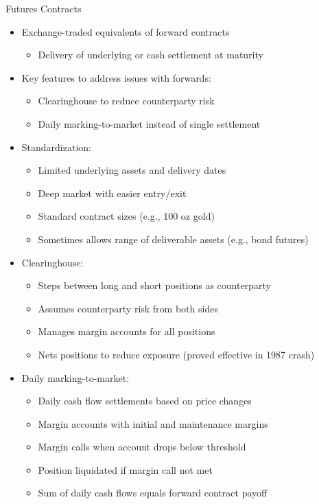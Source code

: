 \documentclass[10pt]{beamer}
\begin{document}
\begin{frame}{Futures Contracts}
  \begin{itemize}[<+->]
    \item Exchange-traded equivalents of forward contracts
      \begin{itemize}
        \item Delivery of underlying or cash settlement at maturity
      \end{itemize}
    \item Key features to address issues with forwards:
      \begin{itemize}
        \item Clearinghouse to reduce counterparty risk
        \item Daily marking-to-market instead of single settlement
      \end{itemize}
    \item Standardization:
      \begin{itemize}
        \item Limited underlying assets and delivery dates
        \item Deep market with easier entry/exit
        \item Standard contract sizes (e.g., 100 oz gold)
        \item Sometimes allows range of deliverable assets (e.g., bond futures)
      \end{itemize}
    \item Clearinghouse:
      \begin{itemize}
        \item Steps between long and short positions as counterparty
        \item Assumes counterparty risk from both sides
        \item Manages margin accounts for all positions
        \item Nets positions to reduce exposure (proved effective in 1987 crash)
      \end{itemize}
    \item Daily marking-to-market:
      \begin{itemize}
        \item Daily cash flow settlements based on price changes
        \item Margin accounts with initial and maintenance margins
        \item Margin calls when account drops below threshold
        \item Position liquidated if margin call not met
        \item Sum of daily cash flows equals forward contract payoff
      \end{itemize}
  \end{itemize}
\end{frame}
\end{document}
